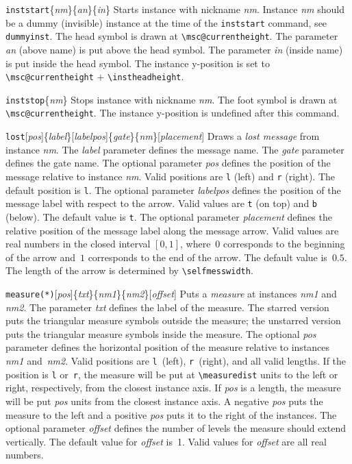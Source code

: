 \documentclass[a4paper]{article}
\newcommand{\cmd}[1]{\texttt{\bslash #1}}
\newcommand{\opt}[1]{[#1]}
\newenvironment{defs}{%
  \begin{list}{}%
              {\setlength{\labelwidth}{0pt}%
               \setlength{\labelsep}{1em}%
               \setlength{\leftmargin}{1em}%
               \setlength{\parsep}{1ex}%
               \setlength{\listparindent}{0pt}%
               \setlength{\rightmargin}{0pt}%
               \renewcommand{\makelabel}[1]{##1}%
               \raggedright%
              }%
  }{%
  \end{list}}
\begin{document}
\begin{defs}
\item[\cmd{inststart}\{\emph{nm}\}\{\emph{an}\}\{\emph{in}\}] Starts
instance with nickname \emph{nm}. Instance \emph{nm} should be a dummy
(invisible) instance at the time of the \cmd{inststart} command, see
\cmd{dummyinst}.  The head symbol is drawn at
\verb|\msc@currentheight|. The parameter \emph{an} (above name) is put
above the head symbol. The parameter \emph{in} (inside name) is put
inside the head symbol. The instance y-position is set to
\verb|\msc@currentheight| $+$ \verb|\instheadheight|.

\item[\cmd{inststop}\{\emph{nm}\}] Stops instance with nickname
\emph{nm}. The foot symbol is drawn at \verb|\msc@currentheight|. The
instance y-position is undefined after this command.

\item[\cmd{lost}\opt{\emph{pos}}\{\emph{label}\}\opt{\emph{labelpos}}\{\emph{gate}\}\{\emph{nm}\}\opt{\emph{placement}}]
Draws a \emph{lost message} from instance \emph{nm}. The \emph{label}
parameter defines the message name. The \emph{gate} parameter defines
the gate name.  The optional parameter \emph{pos} defines the position
of the message relative to instance \emph{nm}. Valid positions are
\verb|l| (left) and \verb|r| (right). The default position is
\verb|l|.  The optional parameter \emph{labelpos} defines the position
of the message label with respect to the arrow. Valid values are
\verb+t+ (on top) and \verb+b+ (below). The default value is \verb+t+.
The optional parameter \emph{placement} defines the relative position
of the message label along the message arrow. Valid values are real
numbers in the closed interval $[0,1]$, where~$0$ corresponds to the
beginning of the arrow and~$1$ corresponds to the end of the
arrow. The default value is~$0.5$. The length of the arrow is
determined by \verb+\selfmesswidth+.

\item[\cmd{measure(*)}\opt{\emph{pos}}\{\emph{txt}\}\{\emph{nm1}\}\{\emph{nm2}\}\opt{\emph{offset}}]
Puts a \emph{measure} at instances \emph{nm1} and \emph{nm2}. The
parameter \emph{txt} defines the label of the measure. The starred
version puts the triangular measure symbols outside the measure; the
unstarred version puts the triangular measure symbols inside the
measure.  The optional \emph{pos} parameter defines the horizontal
position of the measure relative to instances \emph{nm1}
and~\emph{nm2}. Valid positions are \verb|l|~(left), \verb|r|~(right),
and all valid lengths. If the position is \verb|l| or~\verb|r|, the
measure will be put at \verb|\measuredist| units to the left or right,
respectively, from the closest instance axis. If \emph{pos} is a
length, the measure will be put \emph{pos} units from the closest
instance axis. A negative \emph{pos} puts the measure to the left and
a positive \emph{pos} puts it to the right of the instances. The
optional parameter \emph{offset} defines the number of levels the
measure should extend vertically. The default value for \emph{offset}
is~1. Valid values for \emph{offset} are all real numbers.



\end{defs}
\end{document}
